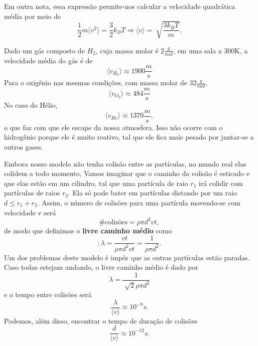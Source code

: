 \documentclass[PhysicsII/phsyicsII_notes.tex]{subfiles}
\begin{document}
Em outra nota, essa expressão permite-nos calcular a velocidade quadrática média por meio de
\[
	\frac{1}{2}m \langle v^{2} \rangle = \frac{3}{2}k_{B}T \Rightarrow \langle v \rangle = \sqrt[]{\frac{3k_{B}T}{m}}.
\]
\begin{example}
	Dado um gás composto de \(H_{2}\), cuja massa molar é \(2\frac{g}{mol}\), em uma sala a 300K, a velocidade média do gás é de
	\[
		\langle v_{H_{2}} \rangle\approx 1900\frac{m}{s}
	\]
	Para o oxigênio nas mesmas condições, com massa molar de \(32 \frac{g}{mol}\),
	\[
		\langle v_{O_{2}} \rangle\approx 484 \frac{m}{s}
	\]
	No caso do Hélio,
	\[
		\langle v_{He} \rangle\approx 1370 \frac{m}{s},
	\]
	o que faz com que ele escape da nossa atmosfera. Isso não ocorre com o hidrogênio porque ele é muito reativo,
	tal que ele fica mais pesado por juntar-se a outros gases.
\end{example}
Embora nosso modelo não tenha colisão entre as partículas, no mundo real elas colidem a todo momento, Vamos imaginar
que o caminho da colisão é esticado e que elas estão em um cilindro, tal que uma partícula de raio \(r_{1}\) irá colidir com partículas de raios \(r_{2}\).
Ela só pode bater em partículas distando por um raio \(d\leq r_{1} + r_{2}\). Assim, o número de colisões para uma
partícula movendo-se com velocidade v será
\[
	\#\text{colisões} = \rho \pi d^{2}vt,
\]
de modo que definimos o \textbf{livre caminho médio} como
\[
	;\lambda = \frac{vt}{\rho \pi d^{2}vt} = \frac{1}{\rho \pi d^{2}}.
\]
Um dos problemas deste modelo é impôr que as outras partículas estão paradas. Caso todas estejam andando, o livre
caminho médio é dado por
\[
	\lambda = \frac{1}{\sqrt[]{2}\rho \pi d^{2}}
\]
e o tempo entre colisões será
\[
	\frac{\lambda }{\langle v \rangle}\approx 10^{-9}s.
\]
Podemos, além disso, encontrar o tempo de duração de colisões
\[
	\frac{d}{\langle v \rangle}\approx 10^{-12}s.
\]
\end{document}
